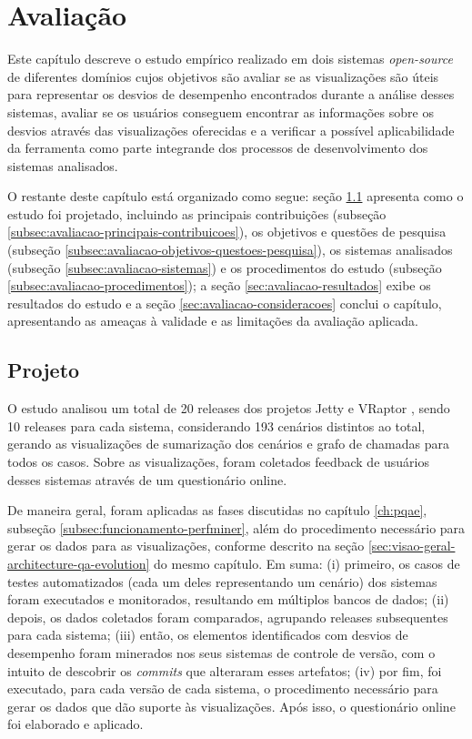 \chapter{Avaliação} \label{ch:avaliacao}

Este capítulo descreve o estudo empírico realizado em dois sistemas \textit{open-source} de diferentes domínios cujos objetivos são avaliar se as visualizações são úteis para representar os desvios de desempenho encontrados durante a análise desses sistemas, avaliar se os usuários conseguem encontrar as informações sobre os desvios através das visualizações oferecidas e a verificar a possível aplicabilidade da ferramenta como parte integrande dos processos de desenvolvimento dos sistemas analisados.

O restante deste capítulo está organizado como segue: seção \ref{sec:avaliacao-projeto} apresenta como o estudo foi projetado, incluindo as principais contribuições (subseção \ref{subsec:avaliacao-principais-contribuicoes}), os objetivos e questões de pesquisa (subseção \ref{subsec:avaliacao-objetivos-questoes-pesquisa}), os sistemas analisados (subseção \ref{subsec:avaliacao-sistemas}) e os procedimentos do estudo (subseção \ref{subsec:avaliacao-procedimentos}); a seção \ref{sec:avaliacao-resultados} exibe os resultados do estudo e a seção \ref{sec:avaliacao-consideracoes} conclui o capítulo, apresentando as ameaças à validade e as limitações da avaliação aplicada.

\section{Projeto} \label{sec:avaliacao-projeto}

O estudo analisou um total de 20 releases dos projetos Jetty \cite{Jetty2016} e VRaptor \cite{VRaptor2017}, sendo 10 releases para cada sistema, considerando 193 cenários distintos ao total, gerando as visualizações de sumarização dos cenários e grafo de chamadas para todos os casos. Sobre as visualizações, foram coletados feedback de usuários desses sistemas através de um questionário online.

De maneira geral, foram aplicadas as fases discutidas no capítulo \ref{ch:pqae}, subseção \ref{subsec:funcionamento-perfminer}, além do procedimento necessário para gerar os dados para as visualizações, conforme descrito na seção \ref{sec:visao-geral-architecture-qa-evolution} do mesmo capítulo. Em suma: (i) primeiro, os casos de testes automatizados (cada um deles representando um cenário) dos sistemas foram executados e monitorados, resultando em múltiplos bancos de dados; (ii) depois, os dados coletados foram comparados, agrupando releases subsequentes para cada sistema; (iii) então, os elementos identificados com desvios de desempenho foram minerados nos seus sistemas de controle de versão, com o intuito de descobrir os \textit{commits} que alteraram esses artefatos; (iv) por fim, foi executado, para cada versão de cada sistema, o procedimento necessário para gerar os dados que dão suporte às visualizações. Após isso, o questionário online foi elaborado e aplicado.

